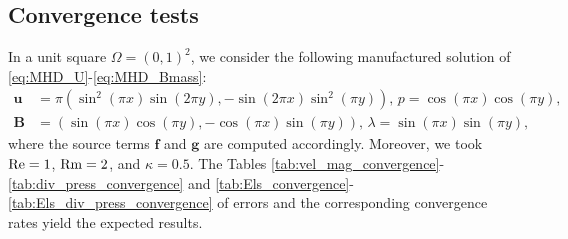 \documentclass[3p]{elsarticle}
\def\V#1{\mathbf{#1}}
\begin{document}
\subsection{Convergence tests}\label{sec:Convergence}
In a unit square $\Omega=(0,1)^2$, we consider the following manufactured solution of \eqref{eq:MHD_U}-\eqref{eq:MHD_Bmass}:
\begin{align*}
\V{u} &= \pi \left(\sin^2(\pi x) \sin(2\pi y), -\sin(2\pi x) \sin^2(\pi y) \right), \, p = \cos(\pi x) \cos(\pi y), \\
\V{B} &= \left(\sin(\pi x) \cos(\pi y), -\cos(\pi x) \sin(\pi y) \right), \, \lambda = \sin(\pi x) \sin(\pi y),
\end{align*}
where the source terms $\V{f}$ and $\V{g}$ are computed accordingly. Moreover, we took ${\rm Re}=1$, ${\rm Rm}=2$, and $\kappa=0.5$. The Tables \ref{tab:vel_mag_convergence}-\ref{tab:div_press_convergence} and \ref{tab:Els_convergence}-\ref{tab:Els_div_press_convergence} of errors and the corresponding convergence rates yield the expected results.
\begin{table}[htbp]
\centering
\caption{Part 1: Errors and rates for 2D manufactured solution of Algorithm \ref{algorithm:SIVS}}
\label{tab:vel_mag_convergence}
\end{table}
\end{document}
